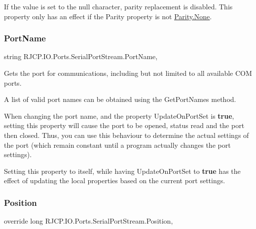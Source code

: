 If the value is set to the null character, parity replacement is disabled. This property only has an effect if the Parity property is not \mbox{\hyperlink{namespace_r_j_c_p_1_1_i_o_1_1_ports_a5328e888558ed5726b3fb7b8b692527ca6adf97f83acf6453d4a6a4b1070f3754}{Parity.\+None}}. \mbox{\label{class_r_j_c_p_1_1_i_o_1_1_ports_1_1_serial_port_stream_adea78dc38512b8fa2e857bd53253e6e3}} 
\subsubsection{\texorpdfstring{PortName}{PortName}}
{\footnotesize\ttfamily string R\+J\+C\+P.\+I\+O.\+Ports.\+Serial\+Port\+Stream.\+Port\+Name\hspace{0.3cm}{\ttfamily [get]}, {\ttfamily [set]}}



Gets the port for communications, including but not limited to all available C\+OM ports. 

A list of valid port names can be obtained using the Get\+Port\+Names method. 

When changing the port name, and the property Update\+On\+Port\+Set is {\bfseries{true}}, setting this property will cause the port to be opened, status read and the port then closed. Thus, you can use this behaviour to determine the actual settings of the port (which remain constant until a program actually changes the port settings).

Setting this property to itself, while having Update\+On\+Port\+Set to {\bfseries{true}} has the effect of updating the local properties based on the current port settings.\mbox{\label{class_r_j_c_p_1_1_i_o_1_1_ports_1_1_serial_port_stream_a667d098a40b33dd97b0dd1ee285bdce7}} 
\subsubsection{\texorpdfstring{Position}{Position}}
{\footnotesize\ttfamily override long R\+J\+C\+P.\+I\+O.\+Ports.\+Serial\+Port\+Stream.\+Position\hspace{0.3cm}{\ttfamily [get]}, {\ttfamily [set]}}



